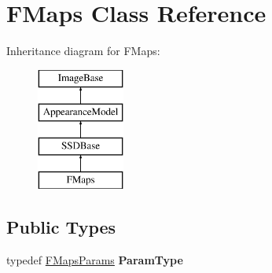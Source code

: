 \hypertarget{classFMaps}{\section{F\-Maps Class Reference}
\label{classFMaps}
}
Inheritance diagram for F\-Maps\-:\begin{figure}[H]
\begin{center}
\leavevmode
\includegraphics[height=4.000000cm]{classFMaps}
\end{center}
\end{figure}
\subsection*{Public Types}
\begin{DoxyCompactItemize}
\item 
\hypertarget{classFMaps_a10ab16ce3b844feafce5696d8b23a9db}{typedef \hyperlink{structFMapsParams}{F\-Maps\-Params} {\bfseries Param\-Type}}\label{classFMaps_a10ab16ce3b844feafce5696d8b23a9db}

\end{DoxyCompactItemize}
